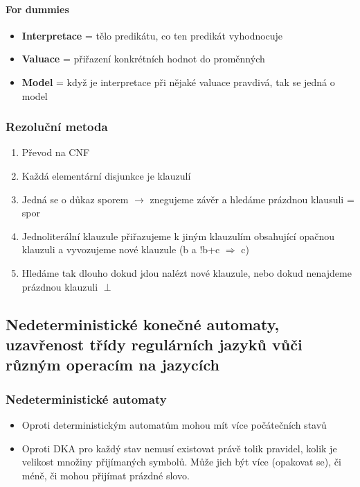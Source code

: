 \documentclass[10pt,a4paper]{article}
\begin{document}
\paragraph{For dummies}
\begin{itemize}
\item \textbf{Interpretace} = tělo predikátu, co ten predikát vyhodnocuje
\item \textbf{Valuace} = přiřazení konkrétních hodnot do proměnných
\item \textbf{Model} = když je interpretace při nějaké valuace pravdivá, tak se jedná o model
\end{itemize}
\subsubsection{Rezoluční metoda}
\begin{enumerate}
\item Převod na CNF
\item Každá elementární disjunkce je klauzulí
\item Jedná se o důkaz sporem $\rightarrow$ znegujeme závěr a hledáme prázdnou klausuli = spor
\item Jednoliterální klauzule přiřazujeme k jiným klauzulím obsahující opačnou klauzuli a vyvozujeme nové klauzule (b a !b+c $\Rightarrow$ c)
\item Hledáme tak dlouho dokud jdou nalézt nové klauzule, nebo dokud nenajdeme prázdnou klauzuli $\perp$
\end{enumerate}
\subsection{Nedeterministické konečné automaty, uzavřenost třídy regulárních jazyků vůči různým operacím na jazycích}
\subsubsection{Nedeterministické automaty}
\begin{itemize}
\item Oproti deterministickým automatům mohou mít více počátečních stavů
\item Oproti DKA pro každý stav nemusí existovat právě tolik pravidel, kolik je velikost množiny přijímaných symbolů. Může jich být více (opakovat se), či méně, či mohou přijímat prázdné slovo.
\end{itemize}
\end{document}
